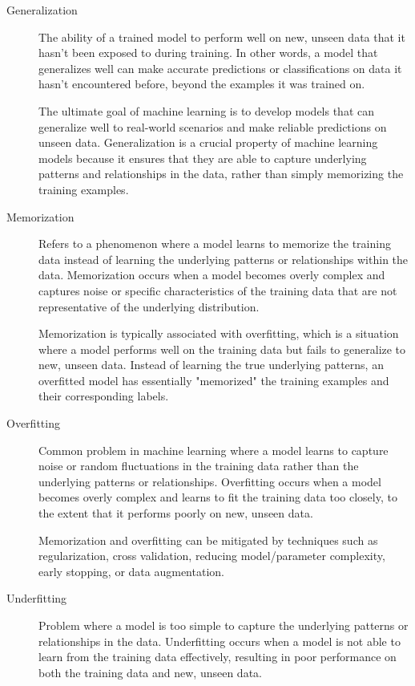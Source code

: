 \documentclass[a4paper]{report}
\begin{document}
\begin{description}
\item[Generalization]
The ability of a trained model to perform well on new, unseen data that it hasn't been exposed to during training. In other words, a model that generalizes well can make accurate predictions or classifications on data it hasn't encountered before, beyond the examples it was trained on.

The ultimate goal of machine learning is to develop models that can generalize well to real-world scenarios and make reliable predictions on unseen data. Generalization is a crucial property of machine learning models because it ensures that they are able to capture underlying patterns and relationships in the data, rather than simply memorizing the training examples.

\item[Memorization]
Refers to a phenomenon where a model learns to memorize the training data instead of learning the underlying patterns or relationships within the data. Memorization occurs when a model becomes overly complex and captures noise or specific characteristics of the training data that are not representative of the underlying distribution.

Memorization is typically associated with overfitting, which is a situation where a model performs well on the training data but fails to generalize to new, unseen data. Instead of learning the true underlying patterns, an overfitted model has essentially "memorized" the training examples and their corresponding labels.

\item[Overfitting]
Common problem in machine learning where a model learns to capture noise or random fluctuations in the training data rather than the underlying patterns or relationships. Overfitting occurs when a model becomes overly complex and learns to fit the training data too closely, to the extent that it performs poorly on new, unseen data.

Memorization and overfitting can be mitigated by techniques such as regularization, cross validation, reducing model/parameter complexity, early stopping, or data augmentation.

\item[Underfitting]
Problem where a model is too simple to capture the underlying patterns or relationships in the data. Underfitting occurs when a model is not able to learn from the training data effectively, resulting in poor performance on both the training data and new, unseen data. 


\end{description}
\end{document}
